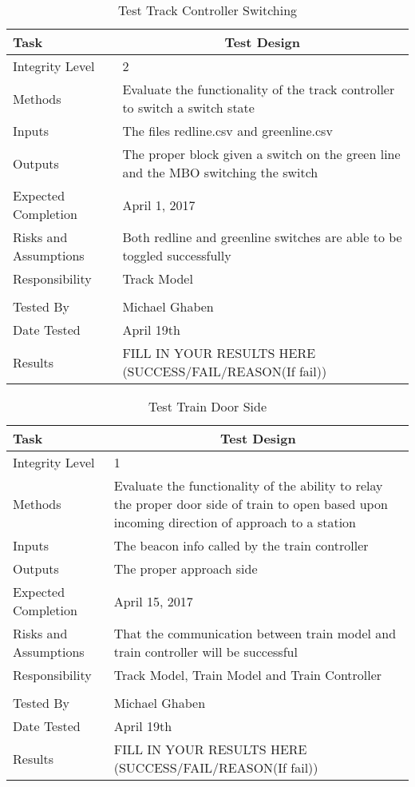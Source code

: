 \documentclass[]{article}
\begin{document}
\begin{table}[H]
	\centering
	\caption{Test Track Controller Switching}
	\begin{tabular}{|l|l|}
		\hline
		Task & \multicolumn{1}{c|}{Test Design} \\ \hline
		Integrity Level & 2 \\ \hline
		Methods & Evaluate the functionality of the track controller to switch a switch state \\ \hline
		Inputs &  The files redline.csv and greenline.csv \\ \hline
		Outputs &  \parbox[t]{10cm}{The proper block given a switch on the green line and the MBO switching the switch}\\ \hline
		Expected Completion & April 1, 2017\\ \hline
		Risks and Assumptions & Both redline and greenline switches are able to be toggled successfully \\ \hline
		Responsibility & Track Model\\ \hline
		\\ \hline
		Tested By   &  Michael Ghaben\\	\hline
		Date Tested & \parbox[t]{10cm}{April 19th}\\ \hline
		Results & FILL IN YOUR RESULTS HERE (SUCCESS/FAIL/REASON(If fail))\\ \hline
	\end{tabular}
\end{table}

\begin{table}[H]
	\centering
	\caption{Test Train Door Side}
	\begin{tabular}{|l|l|}
		\hline
		Task & \multicolumn{1}{c|}{Test Design} \\ \hline
		Integrity Level & 1 \\ \hline
		Methods &  \parbox[t]{10cm}{Evaluate the functionality of the ability to relay the proper door side of train to open based upon incoming direction of approach to a station} \\ \hline
		Inputs &  The beacon info called by the train controller \\ \hline
		Outputs &  \parbox[t]{10cm}{The proper approach side}\\ \hline
		Expected Completion & April 15, 2017\\ \hline
		Risks and Assumptions & \parbox[t]{10cm}{That the communication between train model and train controller will be successful} \\ \hline
		Responsibility & Track Model, Train Model and Train Controller\\ \hline
		\\ \hline
		Tested By   &  Michael Ghaben\\	\hline
		Date Tested & \parbox[t]{10cm}{April 19th}\\ \hline
		Results & FILL IN YOUR RESULTS HERE (SUCCESS/FAIL/REASON(If fail))\\ \hline
	\end{tabular}
\end{table}
\end{document}
